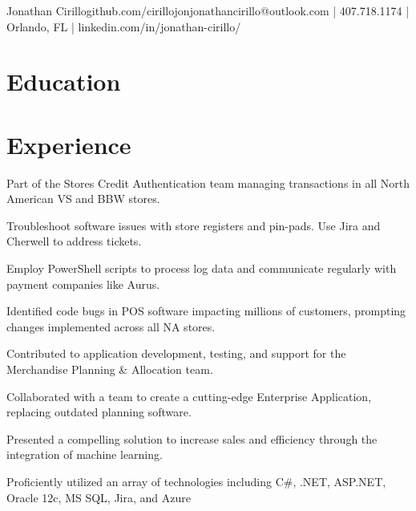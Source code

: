 \documentclass[]{deedy-resume-openfont}
\begin{document}
%
%


\namesection \LARGE {{Jonathan} {Cirillo}}{github.com/cirillojon}{jonathancirillo@outlook.com | 407.718.1174 | Orlando, FL | linkedin.com/in/jonathan-cirillo/}

\hspace{\parindent}

\section{Education}
\sectionsep

\section{Experience}

\vspace{\topsep} 

\date{Aug 2022 – Aug 2023 | Remote}
\begin{tightemize}
\item Part of the Stores Credit Authentication team managing transactions in all North American VS and BBW stores.
\item Troubleshoot software issues with store registers and pin-pads. Use Jira and Cherwell to address tickets. 
\item Employ PowerShell scripts to process log data and communicate regularly with payment companies like Aurus.
\item Identified code bugs in POS software impacting millions of customers, prompting changes implemented across all NA stores.
\end{tightemize}
\sectionsep

\date{May 2022 – Aug 2022 | Remote}
\begin{tightemize}
\item Contributed to application development, testing, and support for the Merchandise Planning \& Allocation team.
\item Collaborated with a team to create a cutting-edge Enterprise Application, replacing outdated planning software.  
\item Presented a compelling solution to increase sales and efficiency through the integration of machine learning.
\item Proficiently utilized an array of technologies including C\#, .NET, ASP.NET, Oracle 12c, MS SQL, Jira, and Azure
\end{tightemize}
\sectionsep
\end{document}
